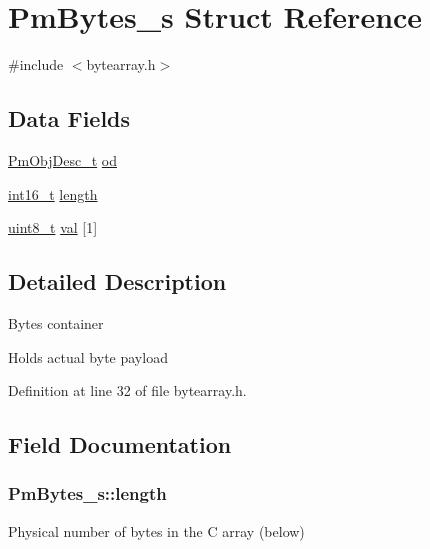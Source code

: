 \hypertarget{struct_pm_bytes__s}{\section{Pm\-Bytes\-\_\-s Struct Reference}
\label{struct_pm_bytes__s}
}


{\ttfamily \#include $<$bytearray.\-h$>$}

\subsection*{Data Fields}
\begin{DoxyCompactItemize}
\item 
\hyperlink{obj_8h_a72d816790acd8eb550fb25268c2b3489}{Pm\-Obj\-Desc\-\_\-t} \hyperlink{struct_pm_bytes__s_af46dba8cd181c493c83f48d7744f29d1}{od}
\item 
\hyperlink{stdint_8h_aa343fa3b3d06292b959ffdd4c4703b06}{int16\-\_\-t} \hyperlink{struct_pm_bytes__s_a43210522d5f528394de08e5665414d0e}{length}
\item 
\hyperlink{stdint_8h_aba7bc1797add20fe3efdf37ced1182c5}{uint8\-\_\-t} \hyperlink{struct_pm_bytes__s_a48c85dd0c8010f5e5ee924dbc893031e}{val} \mbox{[}1\mbox{]}
\end{DoxyCompactItemize}


\subsection{Detailed Description}
Bytes container

Holds actual byte payload 

Definition at line 32 of file bytearray.\-h.



\subsection{Field Documentation}
\hypertarget{struct_pm_bytes__s_a43210522d5f528394de08e5665414d0e}{
\subsubsection[{length}]{ Pm\-Bytes\-\_\-s\-::length}}\label{struct_pm_bytes__s_a43210522d5f528394de08e5665414d0e}
Physical number of bytes in the C array (below) 

